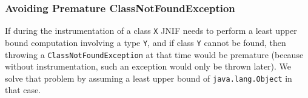 \subsubsection*{Avoiding Premature ClassNotFoundException}
If during the instrumentation of a class \texttt{X}
JNIF needs to perform a least upper bound computation involving a type \texttt{Y},
and if class \texttt{Y} cannot be found,
then throwing a \texttt{ClassNotFoundException} at that time would be premature
(because without instrumentation, such an exception would only be thrown later).
We solve that problem by assuming a least upper bound of \verb=java.lang.Object= in that case.



%
%
%
%
%
%
%
